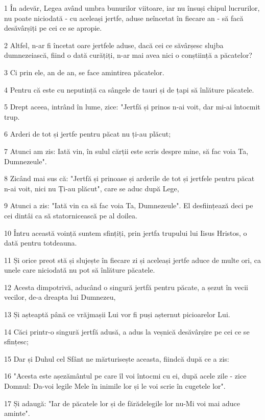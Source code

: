 \par 1 În adevăr, Legea având umbra bunurilor viitoare, iar nu însuși chipul lucrurilor, nu poate niciodată - cu aceleași jertfe, aduse neîncetat în fiecare an - să facă desăvârșiți pe cei ce se apropie.
\par 2 Altfel, n-ar fi încetat oare jertfele aduse, dacă cei ce săvârșesc slujba dumnezeiască, fiind o dată curățiți, n-ar mai avea nici o conștiință a păcatelor?
\par 3 Ci prin ele, an de an, se face amintirea păcatelor.
\par 4 Pentru că este cu neputință ca sângele de tauri și de țapi să înlăture păcatele.
\par 5 Drept aceea, intrând în lume, zice: "Jertfă și prinos n-ai voit, dar mi-ai întocmit trup.
\par 6 Arderi de tot și jertfe pentru păcat nu ți-au plăcut;
\par 7 Atunci am zis: Iată vin, în sulul cărții este scris despre mine, să fac voia Ta, Dumnezeule".
\par 8 Zicând mai sus că: "Jertfă și prinoase și arderile de tot și jertfele pentru păcat n-ai voit, nici nu Ți-au plăcut", care se aduc după Lege,
\par 9 Atunci a zis: "Iată vin ca să fac voia Ta, Dumnezeule". El desființează deci pe cei dintâi ca să statornicească pe al doilea.
\par 10 Întru această voință suntem sfințiți, prin jertfa trupului lui Iisus Hristos, o dată pentru totdeauna.
\par 11 Și orice preot stă și slujește în fiecare zi și aceleași jertfe aduce de multe ori, ca unele care niciodată nu pot să înlăture păcatele.
\par 12 Acesta dimpotrivă, aducând o singură jertfă pentru păcate, a șezut în vecii vecilor, de-a dreapta lui Dumnezeu,
\par 13 Și așteaptă până ce vrăjmașii Lui vor fi puși așternut picioarelor Lui.
\par 14 Căci printr-o singură jertfă adusă, a adus la veșnică desăvârșire pe cei ce se sfințesc;
\par 15 Dar și Duhul cel Sfânt ne mărturisește aceasta, fiindcă după ce a zis:
\par 16 "Acesta este așezământul pe care îl voi întocmi cu ei, după acele zile - zice Domnul: Da-voi legile Mele în inimile lor și le voi scrie în cugetele lor".
\par 17 Și adaugă: "Iar de păcatele lor și de fărădelegile lor nu-Mi voi mai aduce aminte".
